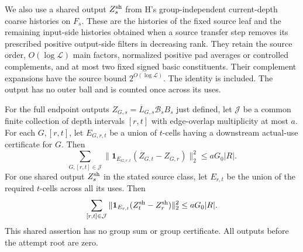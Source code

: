 We also use a shared output \(Z_s^{\rm sh}\) from H's
group-independent current-depth coarse histories on \(F_s\).
These are the histories of the fixed source leaf and the remaining
input-side histories obtained when a source transfer step removes
its prescribed positive output-side filters in decreasing rank.
They retain the source order, \(O(\log\mathcal L)\) main factors,
normalized positive pad averages or controlled complements, and at
most two fixed signed basic constituents.  Their complement expansions
have the source bound \(2^{O(\log\mathcal L)}\).  The identity is included.
The output has no outer ball and is counted once across its uses.

\begin{lemma}
\label{lem:h-certified-variation}
For the full endpoint outputs
\(Z_{G,s}=\overline L_{G,s}\mathcal B_sB_s\) just defined, let
\(\mathcal J\) be a common finite collection of depth intervals
\([r,t]\) with edge-overlap multiplicity at most \(a\).
For each \(G,[r,t]\), let \(E_{G,r,t}\) be a union of \(t\)-cells
having a downstream actual-use certificate for \(G\).  Then
\begin{equation}
 \sum_{G,[r,t]\in\mathcal J}
   \|\mathbf1_{E_{G,r,t}}(Z_{G,t}-Z_{G,r})\|_2^2
       \le aG_0|R|.
 \label{eq:h-certified-variation}
\end{equation}
For one shared output \(Z_s^{\rm sh}\) in the stated source class,
let \(E_{r,t}\) be the union of the required \(t\)-cells across all
its uses.  Then
\[
 \sum_{[r,t]\in\mathcal J}
   \|\mathbf1_{E_{r,t}}(Z_t^{\rm sh}-Z_r^{\rm sh})\|_2^2
       \le aG_0|R|.
\]
This shared assertion has no group sum or group certificate.
All outputs before the attempt root are zero.
\end{lemma}

